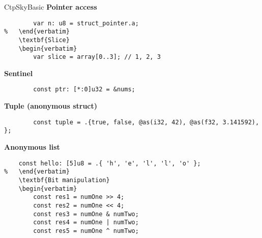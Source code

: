 \documentclass[10pt,a4paper]{article}
\begin{document}
\begin{multicols*}{3}
\begin{mycolorbox}{CtpSky}{Basic}
	\textbf{Pointer access}
	\begin{verbatim}
		var n: u8 = struct_pointer.a;
%	\end{verbatim}
	\textbf{Slice}
	\begin{verbatim}
		var slice = array[0..3]; // 1, 2, 3
	\end{verbatim}
	\textbf{Sentinel} 
	\begin{verbatim}
		const ptr: [*:0]u32 = &nums;
	\end{verbatim}
	\textbf{Tuple (anonymous struct)}
	\begin{verbatim}
		const tuple = .{true, false, @as(i32, 42), @as(f32, 3.141592), };
	\end{verbatim}
	\textbf{Anonymous list} 
	\begin{verbatim}
	const hello: [5]u8 = .{ 'h', 'e', 'l', 'l', 'o' };
%	\end{verbatim}
	\textbf{Bit manipulation}
	\begin{verbatim}
		const res1 = numOne >> 4;
		const res2 = numOne << 4;
		const res3 = numOne & numTwo;
		const res4 = numOne | numTwo;
		const res5 = numOne ^ numTwo;
	\end{verbatim}
\end{mycolorbox}



\end{multicols*}
\end{document}
